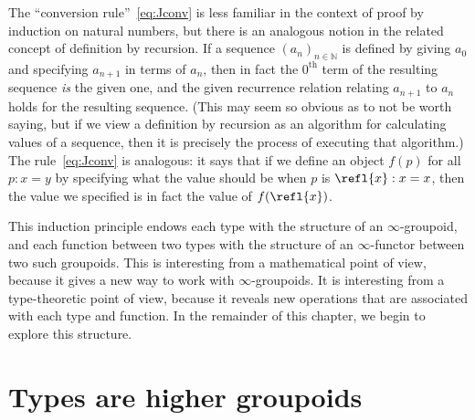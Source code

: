 The ``conversion rule''~\eqref{eq:Jconv} is less familiar in the context of proof by induction on natural numbers, but there is an analogous notion in the related concept of definition by recursion.
If a sequence $(a_n)_{n\in \mathbb{N}}$ is defined by giving $a_0$ and specifying $a_{n+1}$ in terms of $a_n$, then in fact the $0^{\mathrm{th}}$ term of the resulting sequence \emph{is} the given one, and the given recurrence relation relating $a_{n+1}$ to $a_n$ holds for the resulting sequence.
(This may seem so obvious as to not be worth saying, but if we view a definition by recursion as an algorithm for calculating values of a sequence, then it is precisely the process of executing that algorithm.)
The rule~\eqref{eq:Jconv} is analogous: it says that if we define an object $f(p)$ for all $p:x=y$ by specifying what the value should be when $p$ is $\refl{x}:x=x$, then the value we specified is in fact the value of $f(\refl{x})$.

This induction principle endows each type with the structure of an $\infty$-groupoid, and each function between two types with the structure of an $\infty$-functor between two such groupoids.  This is interesting from a mathematical point of view, because it gives a new way to work with
$\infty$-groupoids.  It is interesting from a type-theoretic point of view, because it reveals new operations that are associated with each type and function.  In the remainder of this chapter, we begin to explore this structure.

\section{Types are higher groupoids}
